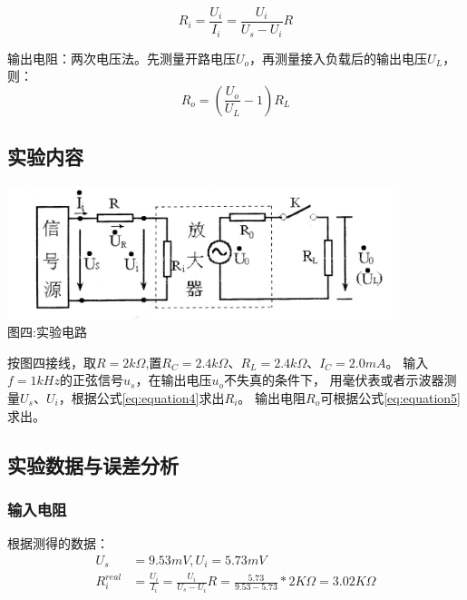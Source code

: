 \documentclass[a4paper]{article}
\begin{document}
    \begin{equation}
        R_i=\frac{U_i}{I_i}=\frac{U_i}{U_s-U_i}R\label{eq:equation4}
    \end{equation}

    {{输出电阻：两次电压法。先测量开路电压$U_o$，再测量接入负载后的输出电压$U_L$，则：}}
    \begin{equation}
        R_o=(\frac{U_o}{U_L}-1)R_L\label{eq:equation5}
    \end{equation}

    \subsection{实验内容}\label{subsec:10}
    \begin{center}
        \includegraphics[height=110pt]{R}\\
        {\small 图四:实验电路}
    \end{center}

    {{按图四接线，取$R=2k\Omega$,置$R_C=2.4k\Omega$、$R_L=2.4k\Omega$、$I_C=2.0mA$。
    输入$f=1kHz$的正弦信号$u_s$，在输出电压$u_o$不失真的条件下，
    用毫伏表或者示波器测量$U_s$、$U_i$，根据公式\eqref{eq:equation4}求出$R_i$。}}
    {{输出电阻$R_o$可根据公式\eqref{eq:equation5}求出。}}

    \subsection{实验数据与误差分析}\label{subsec:11}

    \subsubsection{输入电阻}
    {{根据测得的数据：}}
    \begin{equation}
        \begin{aligned}
            U_s&=9.53mV,U_i=5.73mV\\
            R_i^{real}&=\frac{U_i}{I_i}=\frac{U_i}{U_s-U_i}R=\frac{5.73}{9.53-5.73}*2K\Omega=3.02K\Omega
        \end{aligned}\label{eq:equation6}
    \end{equation}
\end{document}
